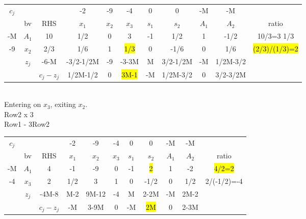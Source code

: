 \documentclass[answers]{exam}
\begin{document}
\begin{tabular}{ccccccccccc}
	$c_j$                   &                            &                                & -2        & -9    & -4    & 0     & 0        & -M    & -M       &               \\
	\multicolumn{1}{c|}{}   & \multicolumn{1}{c|}{bv}    & \multicolumn{1}{c|}{RHS}       & $x_1$     & $x_2$ & $x_3$ & $s_1$ & $s_2$    & $A_1$ & $A_2$    & ratio         \\ \cline{1-10}
	\multicolumn{1}{c|}{-M} & \multicolumn{1}{c|}{$A_1$} & \multicolumn{1}{c|}{10}        & 1/2       & 0     & 3     & -1    & 1/2      & 1     & -1/2     & 10/3=3 1/3    \\
	\multicolumn{1}{c|}{-9} & \multicolumn{1}{c|}{$x_2$} & \multicolumn{1}{c|}{2/3}       & 1/6       & 1     & \hl{1/3}   & 0     & -1/6     & 0     & 1/6      & \hl{(2/3)/(1/3)=2} \\ \cline{1-10}
	& \multicolumn{1}{c|}{$z_j$} & \multicolumn{1}{c|}{-6-M}      & -3/2-1/2M & -9    & -3-3M & M     & 3/2-1/2M & -M    & 1/2M-3/2 &               \\ \cline{3-10}
	&                            & \multicolumn{1}{c|}{$c_j-z_j$} & 1/2M-1/2  & 0     & \hl{3M-1}  & -M    & 1/2M-3/2 & 0     & 3/2-3/2M &              
\end{tabular} \\

\noindent
Entering on $x_3$, exiting $x_2$. \\
Row2 x 3 \\
Row1 - 3Row2 \\


\begin{tabular}{ccccccccccc}
	$c_j$                   &                            &                                & -2    & -9    & -4    & 0     & 0     & -M    & -M    &             \\
	\multicolumn{1}{c|}{}   & \multicolumn{1}{c|}{bv}    & \multicolumn{1}{c|}{RHS}       & $x_1$ & $x_2$ & $x_3$ & $s_1$ & $s_2$ & $A_1$ & $A_2$ & ratio       \\ \cline{1-10}
	\multicolumn{1}{c|}{-M} & \multicolumn{1}{c|}{$A_1$} & \multicolumn{1}{c|}{4}         & -1    & -9    & 0     & -1    & \hl{2}     & 1     & -2    & \hl{4/2=2}       \\
	\multicolumn{1}{c|}{-4} & \multicolumn{1}{c|}{$x_3$} & \multicolumn{1}{c|}{2}         & 1/2   & 3     & 1     & 0     & -1/2  & 0     & 1/2   & 2/(-1/2)=-4 \\ \cline{1-10}
	& \multicolumn{1}{c|}{$z_j$} & \multicolumn{1}{c|}{-4M-8}     & M-2   & 9M-12 & -4    & M     & 2-2M  & -M    & 2M-2  &             \\ \cline{3-10}
	&                            & \multicolumn{1}{c|}{$c_j-z_j$} & -M    & 3-9M  & 0     & -M    & \hl{2M}    & 0     & 2-3M  &            
\end{tabular} \\
\end{document}
